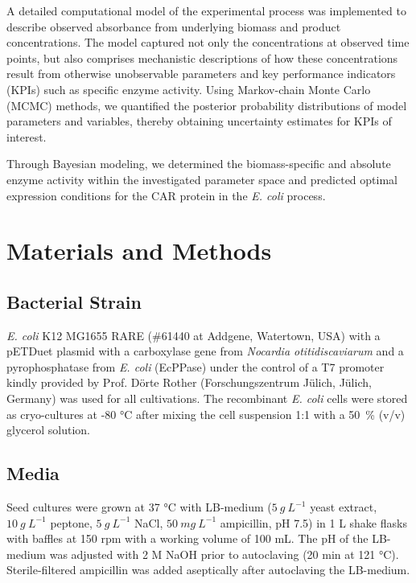 \documentclass[sn-standardnature]{sn-jnl}%
\theoremstyle{thmstyleone}%
\theoremstyle{thmstyletwo}%
\theoremstyle{thmstylethree}%
\begin{document}
A detailed computational model of the experimental process was implemented to describe observed absorbance from underlying biomass and product concentrations.
The model captured not only the concentrations at observed time points, but also comprises mechanistic descriptions of how these concentrations result from otherwise unobservable parameters and key performance indicators (KPIs) such as specific enzyme activity.
Using Markov-chain Monte Carlo (MCMC) methods, we quantified the posterior probability distributions of model parameters and variables, thereby obtaining uncertainty estimates for KPIs of interest.

Through Bayesian modeling, we determined the biomass-specific and absolute enzyme activity within the investigated parameter space and predicted optimal expression conditions for the CAR protein in the \textit{E. coli} process.

\section*{Materials and Methods}
\label{sec_mmm}

\subsection{Bacterial Strain}

\textit{E. coli} K12 MG1655 RARE (\#61440 at Addgene, Watertown, USA) with a pETDuet plasmid with a carboxylase gene from \textit{Nocardia otitidiscaviarum} and a pyrophosphatase from \textit{E. coli} (EcPPase) under the control of a T7 promoter \cite{weber2021production} kindly provided by Prof. Dörte Rother (Forschungszentrum Jülich, Jülich, Germany) was used for all cultivations.
The recombinant \textit{E. coli} cells were stored as cryo-cultures at -80 °C after mixing the cell suspension 1:1 with a 50~\% (v/v) glycerol solution.

\subsection{Media}

Seed cultures were grown at 37 °C with LB-medium ($5\ g\ L^{-1}$ yeast extract, $10\ g\ L^{-1}$ peptone, $5\ g\ L^{-1}$ NaCl, $50\ mg\ L^{-1}$ ampicillin, pH 7.5) in 1 L shake flasks with baffles at 150 rpm with a working volume of 100 mL.
The pH of the LB-medium was adjusted with 2 M NaOH prior to autoclaving (20 min at 121 °C).
Sterile-filtered ampicillin was added aseptically after autoclaving the LB-medium.
\end{document}
